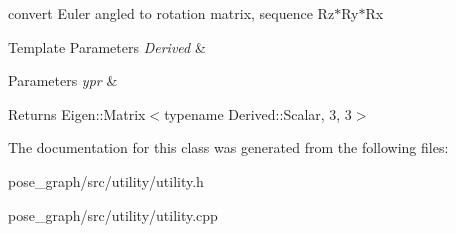 convert Euler angled to rotation matrix, sequence Rz$\ast$\+Ry$\ast$\+Rx 


\begin{DoxyTemplParams}{Template Parameters}
{\em Derived} & \\
\hline
\end{DoxyTemplParams}

\begin{DoxyParams}{Parameters}
{\em ypr} & \\
\hline
\end{DoxyParams}
\begin{DoxyReturn}{Returns}
Eigen\+::\+Matrix$<$typename Derived\+::\+Scalar, 3, 3$>$ 
\end{DoxyReturn}


The documentation for this class was generated from the following files\+:\begin{DoxyCompactItemize}
\item 
pose\+\_\+graph/src/utility/utility.\+h\item 
pose\+\_\+graph/src/utility/utility.\+cpp\end{DoxyCompactItemize}
